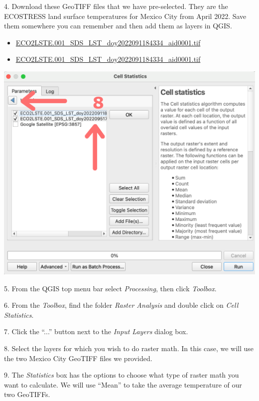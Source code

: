 \documentclass[oneside,a4paper,11pt,explicit]{book}
\begin{document}
\vspace{.5em}

4. Download these GeoTIFF files that we have pre-selected. They are the ECOSTRESS land surface temperatures for Mexico City from April 2022. Save them somewhere you can remember and then add them as layers in QGIS. 

\begin{itemize}
    \item \href{https://jeremydforsythe.github.io/icecream-tutorials/Tutorial13_RasterCalculator/ECO2LSTE.001_SDS_LST_doy2022091184334_aid0001.tif}{\small ECO2LSTE.001\_SDS\_LST\_doy2022091184334\_aid0001.tif}
    \item \href{https://jeremydforsythe.github.io/icecream-tutorials/Tutorial13_RasterCalculator/ECO2LSTE.001_SDS_LST_doy2022091184334_aid0001.tif}{\small ECO2LSTE.001\_SDS\_LST\_doy2022091184334\_aid0001.tif}
\end{itemize}

\vspace{.5em}

\centerline{\includegraphics[width=.6\textwidth]{CellSelect.png}}

\vspace{.5em}

5. From the QGIS top menu bar select \textit{Processing}, then click \textit{Toolbox}.

6. From the \textit{Toolbox}, find the folder \textit{Raster Analysis} and double click on \textit{Cell Statistics}.

7. Click the ``...'' button next to the \textit{Input Layers} dialog box. 

8. Select the layers for which you wish to do raster math. In this case, we will use the two Mexico City GeoTIFF files we provided.

9. The \textit{Statistics} box has the options to choose what type of raster math you want to calculate. We will use ``Mean'' to take the average temperature of our two GeoTIFFs. 
\end{document}
